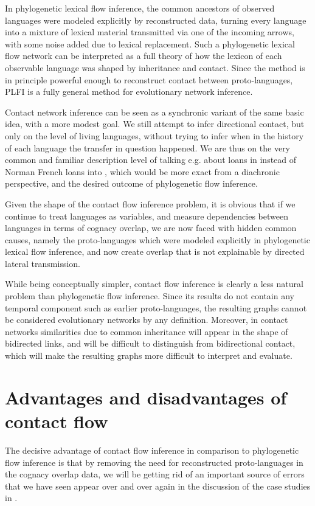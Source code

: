 In phylogenetic lexical flow inference, the common ancestors of observed languages were modeled explicitly by reconstructed data, turning every language into a mixture of lexical material transmitted via one of the incoming arrows, with some noise added due to lexical replacement. Such a phylogenetic lexical flow network can be interpreted as a full theory of how the lexicon of each observable language was shaped by inheritance and contact. Since the method is in principle powerful enough to reconstruct contact between proto-languages, PLFI is a fully general method for evolutionary network inference.

Contact network inference can be seen as a synchronic variant of the same basic idea, with a more modest goal. We still attempt to infer directional contact, but only on the level of living languages, without trying to infer when in the history of each language the transfer in question happened. We are thus on the very common and familiar description level of talking e.g. about  loans in  instead of Norman French loans into , which would be more exact from a diachronic perspective, and the desired outcome of phylogenetic flow inference.

Given the shape of the contact flow inference problem, it is obvious that if we continue to treat languages as variables, and measure dependencies between languages in terms of cognacy overlap, we are now faced with hidden common causes, namely the proto-languages which were modeled explicitly in phylogenetic lexical flow inference, and now create overlap that is not explainable by directed lateral transmission.

While being conceptually simpler, contact flow inference is clearly a less natural problem than phylogenetic flow inference. Since its results do not contain any temporal component such as earlier proto-languages, the resulting graphs cannot be considered evolutionary networks by any definition. Moreover, in contact networks similarities due to common inheritance will appear in the shape of bidirected links, and will be difficult to distinguish from bidirectional contact, which will make the resulting graphs more difficult to interpret and evaluate.

\section{Advantages and disadvantages of contact flow}\label{sec:7.2}
The decisive advantage of contact flow inference in comparison to phylogenetic flow inference is that by removing the need for reconstructed proto-languages in the cognacy overlap data, we will be getting rid of an important source of errors that we have seen appear over and over again in the discussion of the case studies in .

